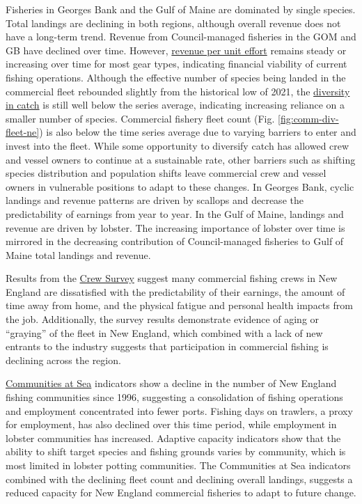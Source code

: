 \documentclass[
  10pt,
]{article}
\begin{document}
Fisheries in Georges Bank and the Gulf of Maine are dominated by single species. Total landings are declining in both regions, although overall revenue does not have a long-term trend. Revenue from Council-managed fisheries in the GOM and GB have declined over time. However, \href{https://noaa-edab.github.io/catalog/effective_sweptarea.html}{revenue per unit effort} remains steady or increasing over time for most gear types, indicating financial viability of current fishing operations. Although the effective number of species being landed in the commercial fleet rebounded slightly from the historical low of 2021, the \href{https://noaa-edab.github.io/catalog/recdat.html}{diversity in catch} is still well below the series average, indicating increasing reliance on a smaller number of species. Commercial fishery fleet count (Fig. \ref{fig:comm-div-fleet-ne}) is also below the time series average due to varying barriers to enter and invest into the fleet. While some opportunity to diversify catch has allowed crew and vessel owners to continue at a sustainable rate, other barriers such as shifting species distribution and population shifts leave commercial crew and vessel owners in vulnerable positions to adapt to these changes. In Georges Bank, cyclic landings and revenue patterns are driven by scallops and decrease the predictability of earnings from year to year. In the Gulf of Maine, landings and revenue are driven by lobster. The increasing importance of lobster over time is mirrored in the decreasing contribution of Council-managed fisheries to Gulf of Maine total landings and revenue.

Results from the \href{https://noaa-edab.github.io/catalog/crew_survey.html}{Crew Survey} suggest many commercial fishing crews in New England are dissatisfied with the predictability of their earnings, the amount of time away from home, and the physical fatigue and personal health impacts from the job. Additionally, the survey results demonstrate evidence of aging or ``graying'' of the fleet in New England, which combined with a lack of new entrants to the industry suggests that participation in commercial fishing is declining across the region.

\href{https://noaa-edab.github.io/catalog/communities_at_sea.html}{Communities at Sea} indicators show a decline in the number of New England fishing communities since 1996, suggesting a consolidation of fishing operations and employment concentrated into fewer ports. Fishing days on trawlers, a proxy for employment, has also declined over this time period, while employment in lobster communities has increased. Adaptive capacity indicators show that the ability to shift target species and fishing grounds varies by community, which is most limited in lobster potting communities. The Communities at Sea indicators combined with the declining fleet count and declining overall landings, suggests a reduced capacity for New England commercial fisheries to adapt to future change.
\end{document}
